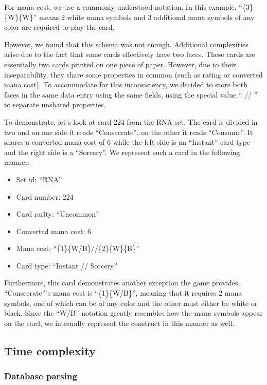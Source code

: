 \documentclass[12pt, letterpaper]{article}
\begin{document}
For mana cost,
we use a commonly-understood notation.
In this example,
\enquote{\{3\}\{W\}\{W\}} means $ 2 $ white mana symbols
and $ 3 $ additional mana symbols of any color
are required to play the card.

However, we found that this schema was not enough.
Additional complexities arise due to the fact that
some cards effectively have two faces.
These cards are essentially two cards printed on one piece
of paper.
However, due to their inseparability,
they share some properties in common
(such as rating or converted mana cost).
To accommodate for this inconsistency,
we decided to store both faces in the same data entry
using the same fields,
using the special value \enquote{ // } to separate unshared properties.

To demonstrate,
let's look at card 224 from the RNA set.
The card is divided in two and on one side it reads \enquote{Consecrate},
on the other it reads \enquote{Consume}.
It shares a converted mana cost of $ 6 $
while the left side is an \enquote{Instant} card type
and the right side is a \enquote{Sorcery}.
We represent such a card in the following manner:

\begin{itemize}
    \item Set id: \enquote{RNA}
    \item Card number: $ 224 $
    \item Card rarity: \enquote{Uncommon}
    \item Converted mana cost: $ 6 $
    \item Mana cost: \enquote{\{1\}\{W/B\}//\{2\}\{W\}\{B\}}
    \item Card type: \enquote{Instant // Sorcery}
\end{itemize}

Furthermore,
this card demonstrates another exception the game provides.
\enquote{Consecrate}'s mana cost is \enquote{\{1\}\{W/B\}},
meaning that it requires $ 2 $ mana symbols,
one of which can be of any color and the other must either be white or black.
Since the \enquote{W/B} notation greatly resembles how the mana symbols appear
on the card,
we internally represent the construct in this manner as well.

\subsection{Time complexity}

\subsubsection{Database parsing}
\end{document}
